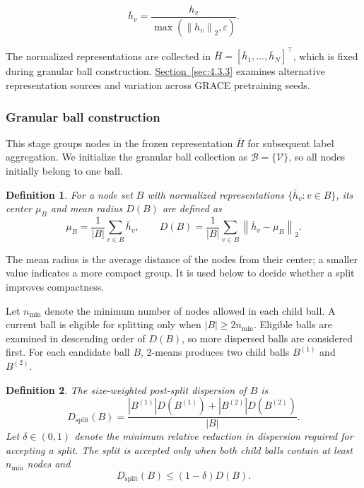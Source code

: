 \documentclass[10pt,letterpaper,nopreprintline]{elsarticle}
\theoremstyle{plain}
\newtheorem{definition}{Definition}
\begin{document}
\begin{equation}\label{eq:3}
{\bar{h}}_{v} = \frac{h_{v}}{\max(\left\| h_{v} \right\|_{2},\varepsilon)}.
\end{equation}

The normalized representations are collected in \(\bar{H} = \left\lbrack {\bar{h}}_{1},\ldots,{\bar{h}}_{N} \right\rbrack^{\top}\), which is fixed during granular ball construction. \hyperref[sec:4.3.3]{Section~\ref*{sec:4.3.3}} examines alternative representation sources and variation across GRACE pretraining seeds.

\subsubsection{Granular ball construction}\label{sec:3.2.2}

This stage groups nodes in the frozen representation \(\bar H\) for subsequent label aggregation. We initialize the granular ball collection as \(\mathcal B=\{\mathcal V\}\), so all nodes initially belong to one ball.

\Needspace{64pt}
\begin{definition}
For a node set \(B\) with normalized representations \(\{\bar h_v:v\in B\}\), its center \(\mu_B\) and mean radius \(D(B)\) are defined as
\begin{equation}\label{eq:4}
\mu_{B} = \frac{1}{|B|}\sum_{v \in B}{\bar{h}}_{v},\quad\quad D(B) = \frac{1}{|B|}\sum_{v \in B}\left\| {\bar{h}}_{v} - \mu_{B} \right\|_{2}.
\end{equation}
\end{definition}

The mean radius is the average distance of the nodes from their center; a smaller value indicates a more compact group. It is used below to decide whether a split improves compactness.

\Needspace{64pt}

Let \(n_{\min}\) denote the minimum number of nodes allowed in each child ball. A current ball is eligible for splitting only when \(|B|\geq 2n_{\min}\). Eligible balls are examined in descending order of \(D(B)\), so more dispersed balls are considered first. For each candidate ball \(B\), 2-means produces two child balls \(B^{(1)}\) and \(B^{(2)}\).

\begin{definition}
The size-weighted post-split dispersion of \(B\) is
\begin{equation}\label{eq:5}
D_{\mathrm{split}}(B) = \frac{|B^{(1)}|D(B^{(1)}) + |B^{(2)}|D(B^{(2)})}{|B|}.
\end{equation}
Let \(\delta \in (0,1)\) denote the minimum relative reduction in dispersion required for accepting a split. The split is accepted only when both child balls contain at least \(n_{\min}\) nodes and
\begin{equation}\label{eq:6}
D_{\mathrm{split}}(B) \leq (1 - \delta)D(B).
\end{equation}
\end{definition}
\end{document}
